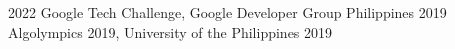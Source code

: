 
\ifen {} \fi
\ifko {} \fi
\begin{cvhonors}

  \cvhonor
    {} %
    {} %
    {} %
    {2022} %
  \cvhonor
    {} %
    {Google Tech Challenge, Google Developer Group Philippines} %
    {} %
    {2019} %
  \cvhonor
    { } %
    {Algolympics 2019, University of the Philippines} %
    {} %
    {2019} %
\end{cvhonors}

